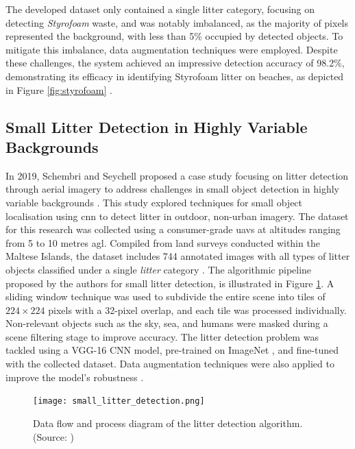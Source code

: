 The developed dataset only contained a single litter category, focusing on detecting \textit{Styrofoam} waste, and was notably imbalanced, as the majority of pixels represented the background, with less than 5\% occupied by detected objects. To mitigate this imbalance, data augmentation techniques were employed. Despite these challenges, the system achieved an impressive detection accuracy of 98.2\%, demonstrating its efficacy in identifying Styrofoam litter on beaches, as depicted in Figure \ref{fig:styrofoam} \cite{styrofoam}.

\subsection{Small Litter Detection in Highly Variable Backgrounds}
\label{subsec:3_smalldetection}

In 2019, Schembri and Seychell proposed a case study focusing on litter detection through aerial imagery to address challenges in small object detection in highly variable backgrounds \cite{small_litter_detection}. This study explored techniques for small object localisation using \gls{cnn} to detect litter in outdoor, non-urban imagery. The dataset for this research was collected using a consumer-grade \glspl{uav} at altitudes ranging from 5 to 10 metres \gls{agl}. Compiled from land surveys conducted within the Maltese Islands, the dataset includes 744 annotated images with all types of litter objects classified under a single \textit{litter} category \cite{small_litter_detection}.
The algorithmic pipeline proposed by the authors for small litter detection, is illustrated in Figure \ref{fig:smalllitterdetection}. A sliding window technique was used to subdivide the entire scene into tiles of $224 \times 224$ pixels with a 32-pixel overlap, and each tile was processed individually. Non-relevant objects such as the sky, sea, and humans were masked during a scene filtering stage to improve accuracy. The litter detection problem was tackled using a VGG-16 CNN model, pre-trained on ImageNet \cite{image_net}, and fine-tuned with the collected dataset. Data augmentation techniques were also applied to improve the model’s robustness \cite{small_litter_detection}.

\begin{figure}[!htbp]
    \centering
    \texttt{[image: small\_litter\_detection.png]}
    \caption{Data flow and process diagram of the litter detection algorithm. (Source: \cite{small_litter_detection})}
    \label{fig:smalllitterdetection}
\end{figure}

